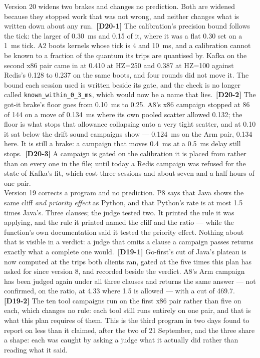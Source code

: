 \documentclass[11pt]{article}
\newcommand{\chgold}[1]{\,{\color{oldcol}\bfseries\footnotesize[#1]}}
\begin{document}
{Version 20 widens two brakes and changes no prediction. Both are widened because they stopped work that was not wrong, and neither changes what is written down about any run. \chgold{D20-1} The calibration's precision bound follows the tick: the larger of 0.30~ms and 0.15 of it, where it was a flat 0.30 set on a 1~ms tick. A2 boots kernels whose tick is 4 and 10~ms, and a calibration cannot be known to a fraction of the quantum its trips are quantised by. Kafka on the second x86 pair came in at 0.410 at HZ=250 and 0.387 at HZ=100 against Redis's 0.128 to 0.237 on the same boots, and four rounds did not move it. The bound each session used is written beside its gate, and the check is no longer called \texttt{known\_within\_0\_3\_ms}, which would now be a name that lies. \chgold{D20-2} The got-it brake's floor goes from 0.10~ms to 0.25. A8's x86 campaign stopped at 86 of 144 on a move of 0.134~ms where its own pooled scatter allowed 0.132; the floor is what stops that allowance collapsing onto a very tight scatter, and at 0.10 it sat below the drift sound campaigns show --- 0.124~ms on the Arm pair, 0.134 here. It is still a brake: a campaign that moves 0.4~ms at a 0.5~ms delay still stops. \chgold{D20-3} A campaign is gated on the calibration it is placed from rather than on every one in the file; until today a Redis campaign was refused for the state of Kafka's fit, which cost three sessions and about seven and a half hours of one pair.\\[3pt]
Version 19 corrects a program and no prediction. P8 says that Java shows the same cliff \emph{and priority effect} as Python, and that Python's rate is at most 1.5 times Java's. Three clauses; the judge tested two. It printed the rule it was applying, and the rule it printed named the cliff and the ratio --- while the function's own documentation said it tested the priority effect. Nothing about that is visible in a verdict: a judge that omits a clause a campaign passes returns exactly what a complete one would. \chgold{D19-1} Go-first's cut of Java's plateau is now computed at the trips both clients ran, gated at the five times this plan has asked for since version 8, and recorded beside the verdict. A8's Arm campaign has been judged again under all three clauses and returns the same answer --- not confirmed, on the ratio, at 4.33 where 1.5 is allowed --- with a cut of 469.7. \chgold{D19-2} The ten tool campaigns run on the first x86 pair rather than five on each, which changes no rule: each tool still runs entirely on one pair, and that is what this plan requires of them. This is the third program in two days found to report on less than it claimed, after the two of 21 September, and the three share a shape: each was caught by asking a judge what it actually did rather than reading what it said.\\[3pt]
}
\end{document}
